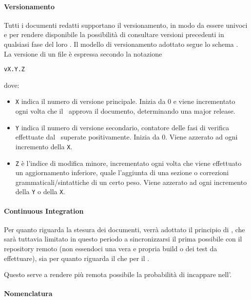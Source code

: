 			\paragraph{Versionamento} \label{Versionamento}
			Tutti i documenti redatti supportano il versionamento, in modo da essere univoci e per rendere disponibile la possibilità di consultare versioni precedenti in qualsiasi fase del loro .
			Il modello di versionamento adottato segue lo schema .\\La versione di un file è espressa secondo la notazione
			\begin{center}
				\texttt{vX.Y.Z}
			\end{center}
			\indent dove:
			\begin{itemize}
				\item \texttt{X} indica il numero di versione principale. Inizia da 0 e viene incrementato ogni volta che il \Res\ approva il documento, determinando	una major release.
				\item \texttt{Y} indica il numero di versione secondario, contatore delle fasi di verifica effettuate dal \Ver\ superate positivamente. Inizia da 0. 	Viene azzerato ad ogni incremento della \texttt{X}.
				\item \texttt{Z} è l'indice di modifica minore, incrementato ogni volta che viene effettuato un aggiornamento inferiore, quale l'aggiunta di una sezione	o correzioni grammaticali/sintattiche di un certo peso. Viene azzerato ad ogni incremento della \texttt{Y} o della \texttt{X}.
			\end{itemize}


			\paragraph{Continuous Integration}
			Per quanto riguarda la stesura dei documenti, verrà adottato il principio di , che sarà tuttavia limitato in questo periodo
			a sincronizzarsi il prima possibile con il repository remoto (non essendoci
			una vera e propria build o dei test da effettuare), sia per quanto riguarda il  che per il .

			Questo serve a rendere più remota possibile la probabilità di incappare nell'.


			\paragraph{Nomenclatura}

